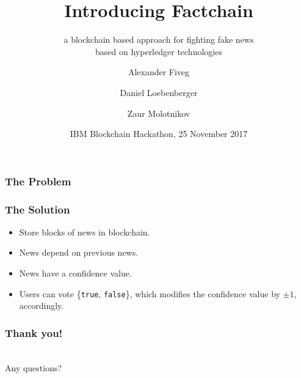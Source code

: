 \documentclass[aspectratio=169]{beamer}
\title{Introducing Factchain}
\subtitle{a blockchain based approach for fighting fake news\\based on hyperledger technologies}
\author{Alexander Fiveg \and Daniel Loebenberger \and Zaur Molotnikov}
\institute{\texttt{\{afiveg,dloeb,zmolo\}@genua.de}}
\date{IBM Blockchain Hackathon, 25 November 2017}
\begin{document}
\frame[plain]{\titlepage}

\begin{frame}
\frametitle{The Problem}

\end{frame}

\begin{frame}
\frametitle{The Solution}

\parbox{12cm}{
\begin{minipage}[c][6cm][c]{8cm}
\begin{itemize}
\item Store blocks of news in blockchain.
\item News depend on previous news.
\item News have a confidence value.
\item Users can vote \{\texttt{true}, \texttt{false}\}, which
      modifies the confidence value by $\pm 1$, accordingly.
\end{itemize}
\end{minipage}
\hfill
\begin{minipage}[c][6cm][c]{3.5cm}
\end{minipage}
}
\end{frame}

\begin{frame}
\frametitle{Thank you!}
\begin{center}
\\
Any questions?
\begin{center}
\end{center}
\end{center}
\end{frame}
\end{document}
